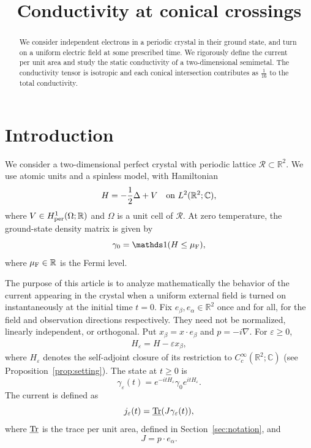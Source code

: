 \documentclass[a4paper,11pt]{article}
\title{Conductivity at conical crossings}
\author{}
\date{}
\newcommand{\Trper}{\underline{\Tr}}
\theoremstyle{plain}
\theoremstyle{remark}
\def\R{{\mathbb R}}
\def\C{{\mathbb C}}
\def\eps{{\varepsilon}}
\def\cR{{\mathcal R}}
\begin{document}
\maketitle

\begin{abstract}
We consider independent electrons in a periodic crystal in their ground
state, and turn on a uniform electric field at some prescribed time.
We rigorously define the current per unit area and study the static
conductivity of a two-dimensional semimetal. The conductivity tensor is isotropic and each
conical intersection contributes as $\frac{1}{16}$ to the total conductivity.
\end{abstract}
\tableofcontents
\section{Introduction}

We consider a two-dimensional perfect crystal with periodic lattice
$\cR\subset\R^2$. We use atomic units and a spinless model, with Hamiltonian
\begin{equation}\label{eq:periodic_Hamiltonian}
H=-\frac12\Delta+V\quad\hbox{on }L^2(\R^2;\C),
\end{equation}
where $V\in H^1_{\rm per}(\Omega;\R)$ and $\Omega$ is a unit cell of $\cR$.
At zero temperature, the ground-state density matrix is given by
\begin{equation}\label{eq:GSDM}
\gamma_0=\mathds 1(H\le\mu_{\rm F}),
\end{equation}
where $\mu_{\rm F}\in\R$ is the Fermi level.

The purpose of this article is to analyze mathematically the behavior
of the current appearing in the crystal when a uniform external field
is turned on instantaneously at the initial time $t=0$.
Fix $e_\beta,e_\alpha\in\R^2$ once and for all, for the field and observation
directions respectively. They need not be normalized, linearly independent,
or orthogonal. Put $x_\beta=x\cdot e_\beta$ and $p=-i\nabla$. For $\eps\ge0$,
\begin{align}\label{def:Heps}
H_\eps=H-\eps x_\beta,
\end{align}
where $H_\eps$ denotes the self-adjoint closure of its restriction to
$C_c^\infty(\R^2;\C)$ (see Proposition~\ref{prop:setting}). The state at
$t\ge0$ is
\begin{equation}\label{def:gammaeps}
\gamma_\eps(t)=e^{-itH_\eps}\gamma_0e^{itH_\eps}.
\end{equation}
The current is defined as
\begin{equation}\label{eq:current}
j_\eps(t)=\Trper(J\gamma_\eps(t)),
\end{equation}
where $\Trper$ is the trace per unit area, defined in
Section~\ref{sec:notation}, and
\begin{equation}\label{def:J}
J=p\cdot e_\alpha.
\end{equation}
\end{document}
